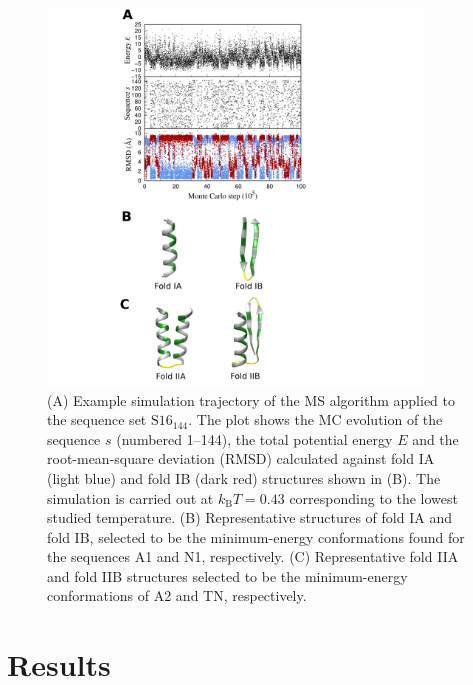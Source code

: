 \documentclass[%
 aip,
rsi,%
 amsmath,amssymb,
 reprint,%
]{revtex4-1}
\newcommand	 {\sbar}	{{s}}
\newcommand	 {\kb}		{{k_\mathrm{B}}}
\begin{document}
\begin{figure}
\includegraphics[width=10.0cm]{MCTrajFolds}
\caption{(A) Example simulation trajectory of the MS algorithm applied to the sequence set $\mathrm{S16}_{144}$. The plot shows the MC evolution of the sequence $\sbar$ (numbered 1--144), the total potential energy $E$ and the root-mean-square deviation (RMSD) calculated against fold IA (light blue) and fold IB (dark red) structures shown in (B). The simulation is carried out at $\kb T = 0.43$ corresponding to the lowest studied temperature.  (B) Representative structures of fold IA and fold IB, selected to be the minimum-energy conformations found for the sequences A1 and N1, respectively. (C) Representative fold IIA and fold IIB structures selected to be the minimum-energy conformations of A2 and TN, respectively. }
\end{figure}

%
%
%
%

\section{Results}
\end{document}
